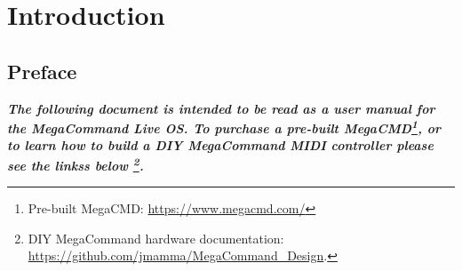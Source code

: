 \chapter{Introduction}
\section{Preface}
\begin{small}
\textbf{\textit{The following document is intended to be read as a user manual for the MegaCommand Live OS. To purchase a pre-built MegaCMD\footnote{Pre-built MegaCMD: \url{https://www.megacmd.com/}}, or to learn how to build a DIY MegaCommand MIDI controller please see the linkss below \footnote{DIY MegaCommand hardware documentation: \url{https://github.com/jmamma/MegaCommand_Design}.}.}}

\end{small}

